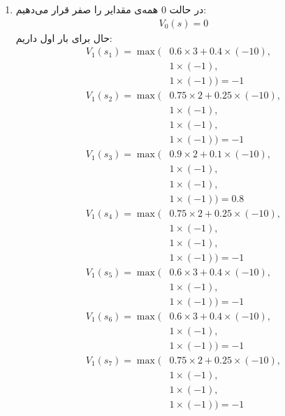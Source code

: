 \begin{enumerate}
    \item در حالت 0 همه‌ی مقدایر را صفر قرار می‌دهیم:
    \begin{gather*}
        V_0(s) = 0
    \end{gather*}
    حال برای بار اول داریم:
    \begin{align*}
        V_1(s_1) = \operatorname{max}(
            &0.6 \times 3 + 0.4 \times (-10),\\
            &1 \times (-1),\\
            &1 \times (-1)
        ) = -1\\
        V_1(s_2) = \operatorname{max}(
            &0.75 \times 2 + 0.25 \times (-10),\\
            &1 \times (-1),\\
            &1 \times (-1),\\
            &1 \times (-1)
        ) = -1\\
        V_1(s_3) = \operatorname{max}(
            &0.9 \times 2 + 0.1 \times (-10),\\
            &1 \times (-1),\\
            &1 \times (-1),\\
            &1 \times (-1)
        ) = 0.8\\
        V_1(s_4) = \operatorname{max}(
            &0.75 \times 2 + 0.25 \times (-10),\\
            &1 \times (-1),\\
            &1 \times (-1),\\
            &1 \times (-1)
        ) = -1\\
        V_1(s_5) = \operatorname{max}(
            &0.6 \times 3 + 0.4 \times (-10),\\
            &1 \times (-1),\\
            &1 \times (-1)
        ) = -1\\
        V_1(s_6) = \operatorname{max}(
            &0.6 \times 3 + 0.4 \times (-10),\\
            &1 \times (-1),\\
            &1 \times (-1)
        ) = -1\\
        V_1(s_7) = \operatorname{max}(
            &0.75 \times 2 + 0.25 \times (-10),\\
            &1 \times (-1),\\
            &1 \times (-1),\\
            &1 \times (-1)
        ) = -1\\

\end{align*}
\end{enumerate}
